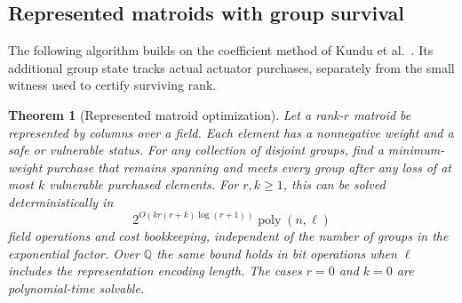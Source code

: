\documentclass[11pt]{article}
\newtheorem{theorem}{Theorem}[section]
\theoremstyle{definition}
\theoremstyle{remark}\newtheorem{remark}[theorem]{Remark}
\begin{document}
\subsection{Represented matroids with group survival}
The following algorithm builds on the coefficient method of
Kundu et al.~\cite[Sections~4.3--4.4]{KNS}. Its additional
group state tracks actual actuator purchases, separately from
the small witness used to certify surviving rank.

\begin{theorem}[Represented matroid optimization]\label{thm:linear}
Let a rank-$r$ matroid be represented by columns over a field.
Each element has a nonnegative weight and a safe or vulnerable
status. For any collection of disjoint groups, find a
minimum-weight purchase that remains spanning and meets every
group after any loss of at most $k$ vulnerable purchased elements.
For $r,k\ge1$, this can be solved deterministically in
\[
 2^{O(kr(r+k)\log(r+1))}\operatorname{poly}(n,\ell)
\]
field operations and cost bookkeeping, independent of the number
of groups in the exponential factor. Over $\mathbb Q$ the same
bound holds in bit operations when $\ell$ includes the
representation encoding length. The cases $r=0$ and $k=0$
are polynomial-time solvable.
\end{theorem}
\end{document}
